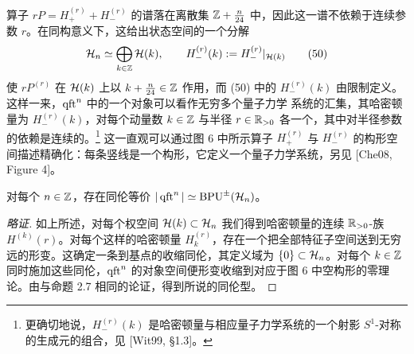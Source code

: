 
算子 $rP=H^{(r)}_++H^{(r)}_-$ 的谱落在离散集 $\mathbb{Z}+\frac{n}{24}$ 中，因此这一谱不依赖于连续参数 $r$。在同构意义下，这给出状态空间的一个分解
\begin{equation}
\mathcal{H}_n\simeq\bigoplus_{k\in\mathbb{Z}}\mathcal{H}(k),\qquad H^{(r)}_-(k):=H^{(r)}_-|_{\mathcal{H}(k)}
\tag{50}
\end{equation}
使 $rP^{(r)}$ 在 $\mathcal{H}(k)$ 上以 $k+\frac{n}{24}\in\mathbb{Z}$ 作用，而 (50) 中的 $H^{(r)}_-(k)$ 由限制定义。这样一来，$\operatorname{qft}^n$ 中的一个对象可以看作无穷多个量子力学%
系统的汇集，其哈密顿量为 $H^{(r)}_-(k)$，对每个动量数 $k\in\mathbb{Z}$ 与半径 $r\in\mathbb{R}_{>0}$ 各一个，其中对半径参数的依赖是连续的。\footnote{更确切地说，$H^{(r)}_-(k)$ 是哈密顿量与相应量子力学系统的一个射影 $S^1$-对称的生成元的组合，见 [Wit99, §1.3]。} 这一直观可以通过图 6 中所示算子 $H^{(r)}_+$ 与 $H^{(r)}_-$ 的构形空间描述精确化：每条竖线是一个构形，它定义一个量子力学系统，另见 [Che08, Figure 4]。


\begin{proposition}[4.7]
对每个 $n\in\mathbb{Z}$，存在同伦等价 $|\operatorname{qft}^n|\simeq\operatorname{BPU}^\pm(\mathcal{H}_n)$。
\end{proposition}

\begin{proof}[略证]
如上所述，对每个权空间 $\mathcal{H}(k)\subset\mathcal{H}_n$ 我们得到哈密顿量的连续 $\mathbb{R}_{>0}$-族 $H^{(k)}(r)$。对每个这样的哈密顿量 $H^{(r)}_k$，存在一个把全部特征子空间送到无穷远的形变。这确定一条到基点的收缩同伦，其定义域为 $\{0\}\subset\mathcal{H}_n$。对每个 $k\in\mathbb{Z}$ 同时施加这些同伦，$\operatorname{qft}^n$ 的对象空间便形变收缩到对应于图 6 中空构形的零理论。由与命题 2.7 相同的论证，得到所说的同伦型。
\end{proof}

